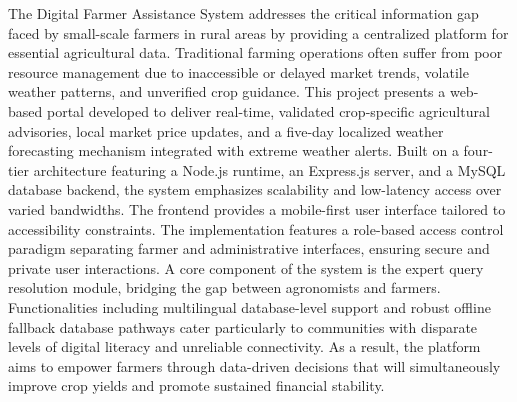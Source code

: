 The Digital Farmer Assistance System addresses the critical information gap faced by small-scale farmers in rural areas by providing a centralized platform for essential agricultural data. Traditional farming operations often suffer from poor resource management due to inaccessible or delayed market trends, volatile weather patterns, and unverified crop guidance. This project presents a web-based portal developed to deliver real-time, validated crop-specific agricultural advisories, local market price updates, and a five-day localized weather forecasting mechanism integrated with extreme weather alerts. Built on a four-tier architecture featuring a Node.js runtime, an Express.js server, and a MySQL database backend, the system emphasizes scalability and low-latency access over varied bandwidths. The frontend provides a mobile-first user interface tailored to accessibility constraints. The implementation features a role-based access control paradigm separating farmer and administrative interfaces, ensuring secure and private user interactions. A core component of the system is the expert query resolution module, bridging the gap between agronomists and farmers. Functionalities including multilingual database-level support and robust offline fallback database pathways cater particularly to communities with disparate levels of digital literacy and unreliable connectivity. As a result, the platform aims to empower farmers through data-driven decisions that will simultaneously improve crop yields and promote sustained financial stability.
